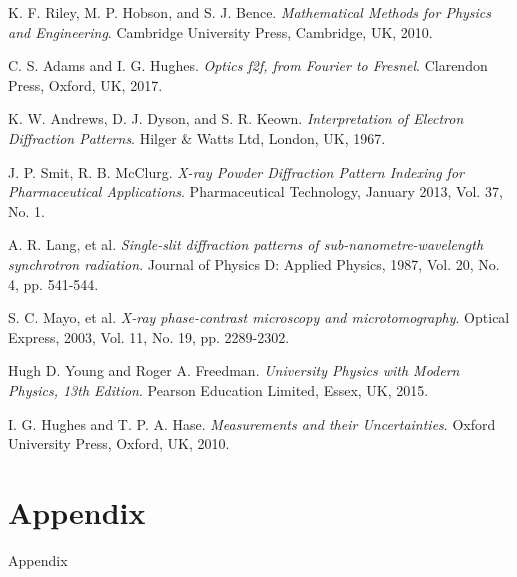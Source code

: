 \documentclass[twocolumn]{revtex4}
\begin{document}
\begin{thebibliography}{5}
	K. F. Riley, M. P. Hobson, and S. J. Bence.
	\textit{Mathematical Methods for Physics and Engineering}.
	Cambridge University Press, Cambridge, UK, 2010.
	
	C. S. Adams and I. G. Hughes.
	\textit{Optics f2f, from Fourier to Fresnel}.
	Clarendon Press, Oxford, UK, 2017.

	K. W. Andrews, D. J. Dyson, and S. R. Keown.
	\textit{Interpretation of Electron Diffraction Patterns}.
	Hilger \& Watts Ltd, London, UK, 1967.
	
	J. P. Smit, R. B. McClurg.	
	\textit{X-ray Powder Diffraction Pattern Indexing for Pharmaceutical Applications}.
	Pharmaceutical Technology, January 2013, Vol. 37, No. 1.
	
	A. R. Lang, et al.
	\textit{Single-slit diffraction patterns of sub-nanometre-wavelength synchrotron radiation}.
	Journal of Physics D: Applied Physics, 1987, Vol. 20, No. 4, pp. 541-544.
	
	S. C. Mayo, et al.
	\textit{X-ray phase-contrast microscopy and microtomography}.
	Optical Express, 2003, Vol. 11, No. 19, pp. 2289-2302.

	Hugh D. Young and Roger A. Freedman.
	\textit{University Physics with Modern Physics, 13th Edition}. 
	Pearson Education Limited, Essex, UK, 2015.
	
	
	I. G. Hughes and T. P. A. Hase.
	\textit{Measurements and their Uncertainties}. 
	Oxford University Press, Oxford, UK, 2010.
	
\end{thebibliography}
\clearpage

\vfill
\twocolumngrid
\vspace{-3ex}
\section*{Appendix}
\vspace{-2ex}

Appendix


\clearpage
\end{document}
